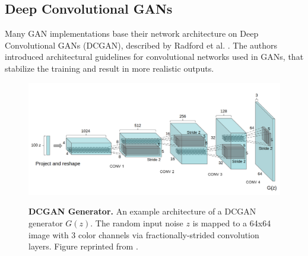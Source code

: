 \documentclass[12pt]{report}
\begin{document}
\subsection{Deep Convolutional GANs} \label{sec:dcgan}


Many GAN implementations base their network architecture on Deep Convolutional GANs (DCGAN), described by Radford et al. \cite{radford_unsupervised_2015}. The authors introduced architectural guidelines for convolutional networks used in GANs, that stabilize the training and result in more realistic outputs.

\begin{figure}[t]
\centering
{\includegraphics[width=\linewidth]{02_background/dcgan_generator}}
\caption{\label{fig:dcgan} \textbf{DCGAN Generator.} An example architecture of a DCGAN generator $G(z)$. The random input noise $z$ is mapped to a 64x64 image with 3 color channels via fractionally-strided convolution layers. Figure reprinted from \cite{radford_unsupervised_2015}.}
\end{figure}
\end{document}
